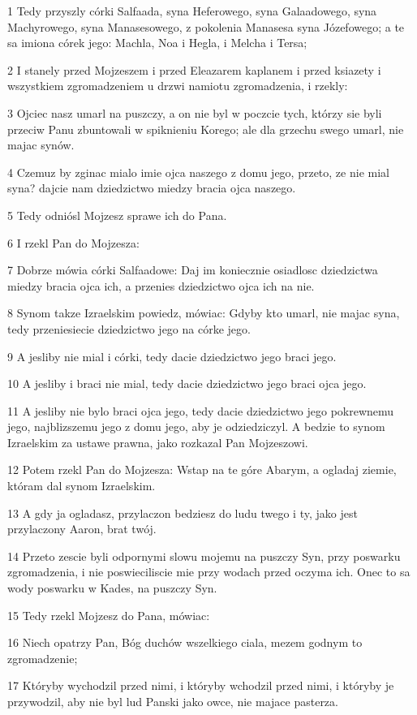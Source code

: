 \par 1 Tedy przyszly córki Salfaada, syna Heferowego, syna Galaadowego, syna Machyrowego, syna Manasesowego, z pokolenia Manasesa syna Józefowego; a te sa imiona córek jego: Machla, Noa i Hegla, i Melcha i Tersa;
\par 2 I stanely przed Mojzeszem i przed Eleazarem kaplanem i przed ksiazety i wszystkiem zgromadzeniem u drzwi namiotu zgromadzenia, i rzekly:
\par 3 Ojciec nasz umarl na puszczy, a on nie byl w poczcie tych, którzy sie byli przeciw Panu zbuntowali w spiknieniu Korego; ale dla grzechu swego umarl, nie majac synów.
\par 4 Czemuz by zginac mialo imie ojca naszego z domu jego, przeto, ze nie mial syna? dajcie nam dziedzictwo miedzy bracia ojca naszego.
\par 5 Tedy odniósl Mojzesz sprawe ich do Pana.
\par 6 I rzekl Pan do Mojzesza:
\par 7 Dobrze mówia córki Salfaadowe: Daj im koniecznie osiadlosc dziedzictwa miedzy bracia ojca ich, a przenies dziedzictwo ojca ich na nie.
\par 8 Synom takze Izraelskim powiedz, mówiac: Gdyby kto umarl, nie majac syna, tedy przeniesiecie dziedzictwo jego na córke jego.
\par 9 A jesliby nie mial i córki, tedy dacie dziedzictwo jego braci jego.
\par 10 A jesliby i braci nie mial, tedy dacie dziedzictwo jego braci ojca jego.
\par 11 A jesliby nie bylo braci ojca jego, tedy dacie dziedzictwo jego pokrewnemu jego, najblizszemu jego z domu jego, aby je odziedziczyl. A bedzie to synom Izraelskim za ustawe prawna, jako rozkazal Pan Mojzeszowi.
\par 12 Potem rzekl Pan do Mojzesza: Wstap na te góre Abarym, a ogladaj ziemie, któram dal synom Izraelskim.
\par 13 A gdy ja ogladasz, przylaczon bedziesz do ludu twego i ty, jako jest przylaczony Aaron, brat twój.
\par 14 Przeto zescie byli odpornymi slowu mojemu na puszczy Syn, przy poswarku zgromadzenia, i nie poswieciliscie mie przy wodach przed oczyma ich. Onec to sa wody poswarku w Kades, na puszczy Syn.
\par 15 Tedy rzekl Mojzesz do Pana, mówiac:
\par 16 Niech opatrzy Pan, Bóg duchów wszelkiego ciala, mezem godnym to zgromadzenie;
\par 17 Któryby wychodzil przed nimi, i któryby wchodzil przed nimi, i któryby je przywodzil, aby nie byl lud Panski jako owce, nie majace pasterza.
